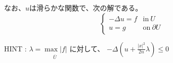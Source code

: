 \documentclass[12pt,b5paper]{ltjsarticle}
\begin{document}
\begin{enumerate}
      なお、$u$は滑らかな関数で、次の解である。
      \begin{equation}
       \begin{cases}
        -\Delta u =f & \text{in}\: U\\
        u=g & \text{on}\: \partial U
       \end{cases}
      \end{equation}


      HINT :
      $\lambda = \underset{\overline{U}}{\max {\lvert f \rvert}}$
      に対して、
      $-\Delta \left(u + \frac{\lvert x \rvert^{2}}{2n}\lambda \right)
      \leq 0$

      \dotfill



      \hrulefill


\end{enumerate}

\hrulefill




\newpage


\hrulefill
\end{document}
